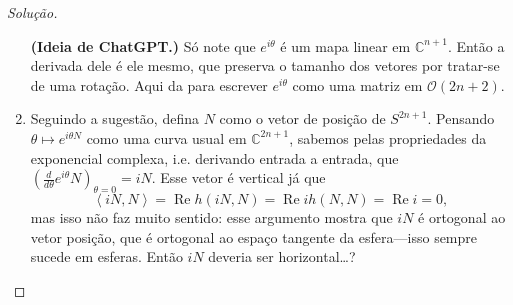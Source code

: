 \begin{proof}[Solução]
\begin{enumerate}[label=(\alph*)]
	\textbf{(Ideia de ChatGPT.)} Só note que \(e^{i\theta}\) é um mapa linear em \(\mathbb{C}^{n+1}\). Então a derivada dele é ele mesmo, que preserva o tamanho dos vetores por tratar-se de uma rotação. Aqui da para escrever \(e^{i\theta}\) como uma matriz em \(\mathcal{O}(2n+2)\).\fi
\item Seguindo a sugestão, defina \(N\) como o vetor de posição de \(S^{2n+1}\). Pensando \(\theta \mapsto e^{i\theta N}\) como uma curva usual em \(\mathbb{C}^{2n+1}\), sabemos pelas propriedades da exponencial complexa, i.e. derivando entrada a entrada, que \((\frac{d}{d\theta}e^{i\theta}N)_{\theta=0}=i N\). Esse vetor é vertical já que \[\left<i N,N\right>=\operatorname{Re}h(i N,N)=\operatorname{Re}ih(N,N)=\operatorname{Re}i=0,\] mas isso não faz muito sentido: esse argumento mostra que \(i N\) é ortogonal ao vetor posição, que é ortogonal ao espaço tangente da esfera---isso sempre sucede em esferas. Então \(i N\) deveria ser horizontal…?


\end{enumerate}
\end{proof}
